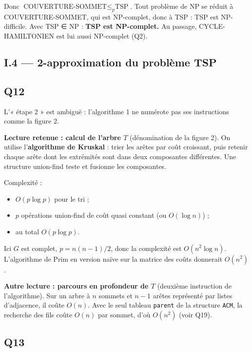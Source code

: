 \documentclass[11pt,a4paper]{article}
\providecommand{\tightlist}{\setlength{\itemsep}{0pt}\setlength{\parskip}{0pt}}
\begin{document}
Donc \(\text{COUVERTURE-SOMMET}\le_p\text{TSP}\). Tout problème de NP se réduit à COUVERTURE-SOMMET, qui est NP-complet, donc à TSP : TSP est NP-difficile. Avec TSP ∈ NP : \textbf{TSP est NP-complet.} Au passage, CYCLE-HAMILTONIEN est lui aussi NP-complet (Q2).

\hypertarget{i.4-2-approximation-du-probluxe8me-tsp}{%
\subsection{I.4 --- 2-approximation du problème TSP}\label{i.4-2-approximation-du-probluxe8me-tsp}}

\hypertarget{q12}{%
\subsection{Q12}\label{q12}}

L'« étape 2 » est ambiguë : l'algorithme 1 ne numérote pas ses instructions comme la figure 2.

\textbf{Lecture retenue : calcul de l'arbre \(T\)} (dénomination de la figure 2). On utilise l'\textbf{algorithme de Kruskal} : trier les arêtes par coût croissant, puis retenir chaque arête dont les extrémités sont dans deux composantes différentes. Une structure union-find teste et fusionne les composantes.

Complexité :

\begin{itemize}
\tightlist
\item
  \(O(p\log p)\) pour le tri ;
\item
  \(p\) opérations union-find de coût quasi constant (ou \(O(\log n)\)) ;
\item
  au total \(O(p\log p)\).
\end{itemize}

Ici \(G\) est complet, \(p=n(n-1)/2\), donc la complexité est \textbf{\(O(n^2\log n)\)}. L'algorithme de Prim en version naïve sur la matrice des coûts donnerait \(O(n^2)\).

\textbf{Autre lecture : parcours en profondeur de \(T\)} (deuxième instruction de l'algorithme). Sur un arbre à \(n\) sommets et \(n-1\) arêtes représenté par listes d'adjacence, il coûte \textbf{\(O(n)\)}. Avec le seul tableau \texttt{parent} de la structure \texttt{ACM}, la recherche des fils coûte \(O(n)\) par sommet, d'où \(O(n^2)\) (voir Q19).

\hypertarget{q13}{%
\subsection{Q13}\label{q13}}
\end{document}
